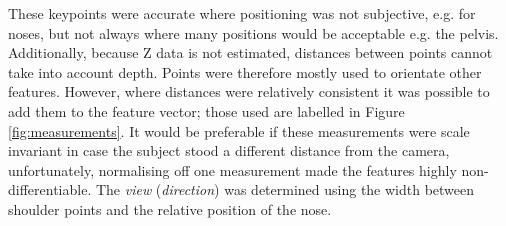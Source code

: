 \documentclass[conference]{IEEEtran}
\begin{document}
\noindent These keypoints were accurate where positioning was not subjective, e.g. for noses, but not always where many positions would be acceptable e.g. the pelvis. Additionally, because Z data is not estimated, distances between points cannot take into account depth. Points were therefore mostly used to orientate other features. However, where distances were relatively consistent it was possible to add them to the feature vector; those used are labelled in Figure \ref{fig:measurements}. It would be preferable if these measurements were scale invariant in case the subject stood a different distance from the camera, unfortunately, normalising off one measurement made the features highly non-differentiable. The \textit{view} (\textit{direction}) was determined using the width between shoulder points and the relative position of the nose.
\end{document}
